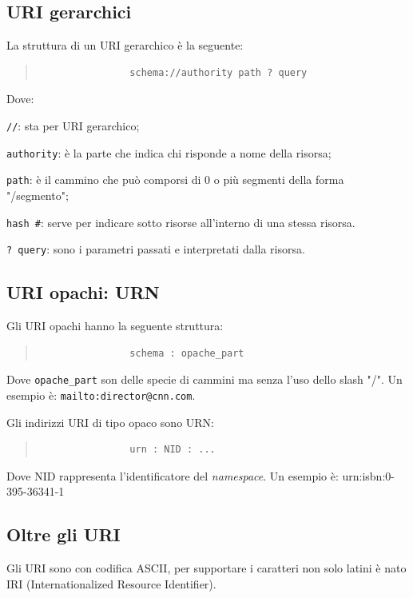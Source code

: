 		\subsection{URI gerarchici}
			La struttura di un URI gerarchico è la seguente:
			\begin{quote}
			\begin{verbatim}
				schema://authority path ? query
			\end{verbatim}
			\end{quote}
			Dove:
			\begin{description}
				\item \verb|//|: sta per URI gerarchico;
				\item \verb|authority|: è la parte che indica chi risponde a nome della risorsa;
				\item \verb|path|: è il cammino che può comporsi di 0 o più segmenti della forma "/segmento";
				\item \verb|hash #|: serve per indicare sotto risorse all'interno di una stessa risorsa.
				\item \verb|? query|: sono i parametri passati e interpretati dalla risorsa.
			\end{description}
		
		\subsection{URI opachi: URN}
			Gli URI opachi hanno la seguente struttura:
			\begin{quote}
			\begin{verbatim}
				schema : opache_part
			\end{verbatim}
			\end{quote}
			
			Dove \verb|opache_part| son delle specie di cammini ma senza l'uso dello slash "/". Un esempio è: \verb|mailto:director@cnn.com|.
			
			Gli indirizzi URI di tipo opaco sono URN:
			\begin{quote}
			\begin{verbatim}
				urn : NID : ...
			\end{verbatim}
			\end{quote}
			Dove NID rappresenta l'identificatore del \emph{namespace}.
			Un esempio è: urn:isbn:0-395-36341-1
		
		\subsection{Oltre gli URI}
			Gli URI sono con codifica ASCII, per supportare i caratteri non solo latini è nato IRI (Internationalized Resource Identifier).
		
